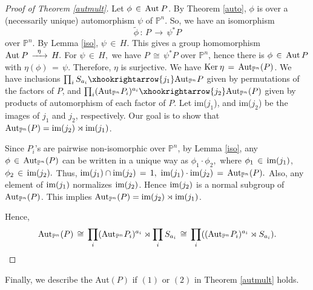 \documentclass[12pt,reqno]{amsart}
\theoremstyle{definition}
\numberwithin{equation}{section}
\begin{document}
\begin{proof}[Proof of Theorem \ref{autmult}]
Let $ \phi \,\in\, \textnormal{Aut}\medspace P$. By Theorem \ref{auto}, $ \phi$ is over a (necessarily unique) automorphism $ \psi$ of $ \mathbb{P}^n$. So, we have an isomorphism 
    $$ \widetilde{\phi}\,:\, P \,\longrightarrow\, \psi^{\ast} P$$
    over $ \mathbb{P}^n$. By Lemma \ref{iso}, $ \psi \,\in\, H.$ This gives a group homomorphism $ \textnormal{Aut} \medspace P \,\xrightarrow {\,\,\,\eta\,\,\,}\, H.$ For $ \psi \,\in\,H,$ we have $ P \,\cong\, \psi^{\ast}P$ over $ \mathbb{P}^n$, hence there is $ \phi \,\in\, \textnormal{Aut}\,{P}$ with $ \eta (\phi)\,=\, \psi.$ Therefore, $ \eta$ is surjective. We have $ \textnormal{Ker} \medspace \eta \,=\, \textnormal{Aut}_{\mathbb{P}^n}(P)$. We have inclusions 
    $\prod_{i}S_{a_{i}} \xhookrightarrow{j_{1}} \textnormal{Aut}_{\mathbb{P}^n}P$ given by permutations of the factors of $P$, and
    $ \prod_{i}(\textnormal{Aut}_{\mathbb{P}^n} P_{i})^{a_{i}}\xhookrightarrow{j_{2}} \textnormal{Aut}_{\mathbb{P}^n}(P) $
    given by products of automorphism of each factor of $ P.$ Let im($j_1$), and im($j_2$) be the images of $j_1$ and $j_2$, respectively. Our goal is to show that $\textnormal{Aut}_{\mathbb{P}^n}(P)=\textnormal{im}(j_2)\rtimes \textnormal{im}(j_1)$.
    
Since $P_i$'s are pairwise non-isomorphic over $ \mathbb{P}^n$, by Lemma \ref{iso}, any $ \phi \,\in\, \textnormal{Aut}_{\mathbb{P}^n}(P)$ can be written in a unique way as $ \phi_{1} \cdot \phi_{2},$ where $ \phi_{1} \,\in\, \textnormal{im}(j_{1})$, $ \phi_{2} \,\in\,  \textnormal{im}(j_{2}).$ Thus, $ \textnormal{im} (j_{1}) \cap \textnormal{im}(j_{2})\,=\,1,$ $ \textnormal{im}(j_{1}) \cdot \textnormal{im}(j_{2})\,=\, \textnormal{Aut}_{\mathbb{P}^n}(P).$ Also, any element of $ \textnormal{im}(j_{1})$ normalizes $ \textnormal{im}(j_{2})$. Hence  $ \textnormal{im}(j_{2})$ is a normal subgroup of $ \textnormal{Aut}_{\mathbb{P}^n}(P)$. This implies $\textnormal{Aut}_{\mathbb{P}^n}(P)=\textnormal{im}(j_2)\rtimes \textnormal{im}(j_1)$.
    
Hence, $$\textnormal{Aut}_{\mathbb{P}^n}(P)\,\cong\, \prod_{i}(\textnormal{Aut}_{\mathbb{P}^n}P_{i})^{a_{i}} \rtimes \prod_{i}S_{a_{i}  } \,\cong\, \prod_{i}((\textnormal{Aut}_{\mathbb{P}^n}P_{i})^{a_{i}} \rtimes S_{a_{i}}).$$ 
\end{proof}
Finally, we describe the Aut$(P)$ if $(1)$ or $(2)$ in Theorem \ref{autmult} holds.
\end{document}
